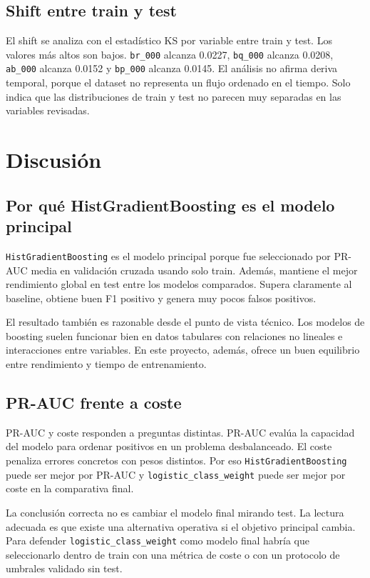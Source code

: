 \documentclass[11pt,a4paper]{article}
\begin{document}
\subsection{Shift entre train y test}

El shift se analiza con el estadístico KS por variable entre train y test. Los valores más altos son bajos. \texttt{br\_000} alcanza 0.0227, \texttt{bq\_000} alcanza 0.0208, \texttt{ab\_000} alcanza 0.0152 y \texttt{bp\_000} alcanza 0.0145. El análisis no afirma deriva temporal, porque el dataset no representa un flujo ordenado en el tiempo. Solo indica que las distribuciones de train y test no parecen muy separadas en las variables revisadas.

\section{Discusión}
\label{sec_discusion}

\subsection{Por qué HistGradientBoosting es el modelo principal}

\texttt{HistGradientBoosting} es el modelo principal porque fue seleccionado por PR-AUC media en validación cruzada usando solo train. Además, mantiene el mejor rendimiento global en test entre los modelos comparados. Supera claramente al baseline, obtiene buen F1 positivo y genera muy pocos falsos positivos.

El resultado también es razonable desde el punto de vista técnico. Los modelos de boosting suelen funcionar bien en datos tabulares con relaciones no lineales e interacciones entre variables. En este proyecto, además, ofrece un buen equilibrio entre rendimiento y tiempo de entrenamiento.

\subsection{PR-AUC frente a coste}

PR-AUC y coste responden a preguntas distintas. PR-AUC evalúa la capacidad del modelo para ordenar positivos en un problema desbalanceado. El coste penaliza errores concretos con pesos distintos. Por eso \texttt{HistGradientBoosting} puede ser mejor por PR-AUC y \texttt{logistic\_class\_weight} puede ser mejor por coste en la comparativa final.

La conclusión correcta no es cambiar el modelo final mirando test. La lectura adecuada es que existe una alternativa operativa si el objetivo principal cambia. Para defender \texttt{logistic\_class\_weight} como modelo final habría que seleccionarlo dentro de train con una métrica de coste o con un protocolo de umbrales validado sin test.
\end{document}

